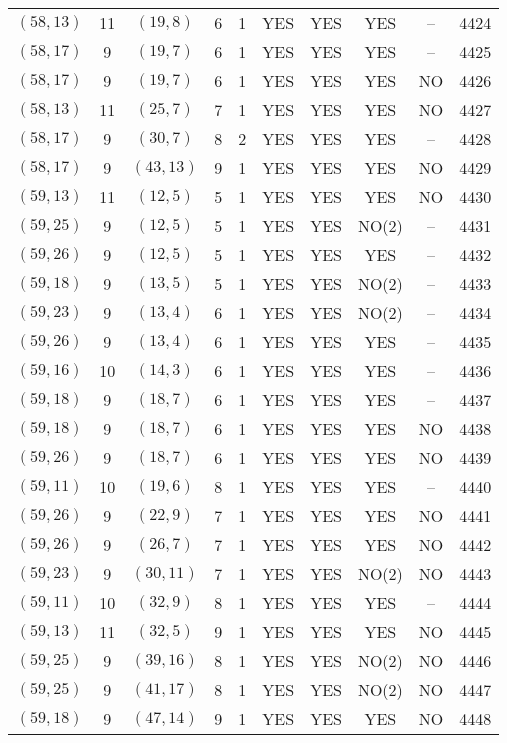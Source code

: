 \begin{longtable}{|c|c|c|c|c|c|c|c|c|c|}
$(58, 13)$ & 11 & $(19, 8)$ & 6 & 1 & YES & YES & YES & -- & 4424\\
$(58, 17)$ & 9 & $(19, 7)$ & 6 & 1 & YES & YES & YES & -- & 4425\\
$(58, 17)$ & 9 & $(19, 7)$ & 6 & 1 & YES & YES & YES & NO & 4426\\
$(58, 13)$ & 11 & $(25, 7)$ & 7 & 1 & YES & YES & YES & NO & 4427\\
$(58, 17)$ & 9 & $(30, 7)$ & 8 & 2 & YES & YES & YES & -- & 4428\\
$(58, 17)$ & 9 & $(43, 13)$ & 9 & 1 & YES & YES & YES & NO & 4429\\
$(59, 13)$ & 11 & $(12, 5)$ & 5 & 1 & YES & YES & YES & NO & 4430\\
$(59, 25)$ & 9 & $(12, 5)$ & 5 & 1 & YES & YES & NO(2) & -- & 4431\\
$(59, 26)$ & 9 & $(12, 5)$ & 5 & 1 & YES & YES & YES & -- & 4432\\
$(59, 18)$ & 9 & $(13, 5)$ & 5 & 1 & YES & YES & NO(2) & -- & 4433\\
$(59, 23)$ & 9 & $(13, 4)$ & 6 & 1 & YES & YES & NO(2) & -- & 4434\\
$(59, 26)$ & 9 & $(13, 4)$ & 6 & 1 & YES & YES & YES & -- & 4435\\
$(59, 16)$ & 10 & $(14, 3)$ & 6 & 1 & YES & YES & YES & -- & 4436\\
$(59, 18)$ & 9 & $(18, 7)$ & 6 & 1 & YES & YES & YES & -- & 4437\\
$(59, 18)$ & 9 & $(18, 7)$ & 6 & 1 & YES & YES & YES & NO & 4438\\
$(59, 26)$ & 9 & $(18, 7)$ & 6 & 1 & YES & YES & YES & NO & 4439\\
$(59, 11)$ & 10 & $(19, 6)$ & 8 & 1 & YES & YES & YES & -- & 4440\\
$(59, 26)$ & 9 & $(22, 9)$ & 7 & 1 & YES & YES & YES & NO & 4441\\
$(59, 26)$ & 9 & $(26, 7)$ & 7 & 1 & YES & YES & YES & NO & 4442\\
$(59, 23)$ & 9 & $(30, 11)$ & 7 & 1 & YES & YES & NO(2) & NO & 4443\\
$(59, 11)$ & 10 & $(32, 9)$ & 8 & 1 & YES & YES & YES & -- & 4444\\
$(59, 13)$ & 11 & $(32, 5)$ & 9 & 1 & YES & YES & YES & NO & 4445\\
$(59, 25)$ & 9 & $(39, 16)$ & 8 & 1 & YES & YES & NO(2) & NO & 4446\\
$(59, 25)$ & 9 & $(41, 17)$ & 8 & 1 & YES & YES & NO(2) & NO & 4447\\
$(59, 18)$ & 9 & $(47, 14)$ & 9 & 1 & YES & YES & YES & NO & 4448\\

\end{longtable}
